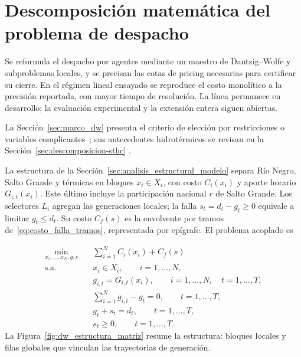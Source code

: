 \section{Descomposición matemática del problema de despacho}
\label{sec:descomposicion_despacho}

Se reformula el despacho por agentes mediante un maestro de Dantzig--Wolfe y subproblemas locales, y se precisan las cotas de pricing necesarias para certificar su cierre. En el régimen lineal ensayado se reproduce el costo monolítico a la precisión reportada, con mayor tiempo de resolución. La línea permanece en desarrollo; la evaluación experimental y la extensión entera siguen abiertas.

La Sección~\ref{sec:marco_dw} presenta el criterio de elección por restricciones o variables complicantes~\cite{ConejoEtAl2006}; sus antecedentes hidrotérmicos se revisan en la Sección~\ref{sec:descomposicion-sthc} \cite{JimenezRedondoConejo1999,BorghettiEtAl2003,SifuentesVargas2007,ScuzziatoEtAl2018,ColonettiEtAl2022,SugishitaGrotheyMcKinnon2024}.

La estructura de la Sección~\ref{sec:analisis_estructural_modelo} separa Río Negro, Salto Grande y térmicas en bloques $x_i\in X_i$, con costo $C_i(x_i)$ y aporte horario $G_{i,t}(x_i)$. Este último incluye la participación nacional $r$ de Salto Grande. Los selectores $L_i$ agregan las generaciones locales; la falla $s_t=d_t-g_t\ge0$ equivale a limitar $g_t\le d_t$. Su costo $C_f(s)$ es la envolvente por tramos de~\eqref{eq:costo_falla_tramos}, representada por epígrafe. El problema acoplado es

\begin{align}
    \min_{x_1,\ldots,x_N,g,s}
    \quad
    &
    \sum_{i=1}^{N} C_i(x_i)
    +
    C_f(s)
    \label{eq:despacho_descomp_obj}
    \\
    \text{s.a.}
    \quad
    &
    x_i \in X_i,
    \qquad i=1,\ldots,N,
    \label{eq:despacho_descomp_local}
    \\
    &
    g_{i,t}=G_{i,t}(x_i),
    \qquad i=1,\ldots,N,\quad t=1,\ldots,T,
    \label{eq:despacho_descomp_generacion_local}
    \\
    &
    \sum_{i=1}^{N} g_{i,t} - g_t = 0,
    \qquad t=1,\ldots,T,
    \label{eq:despacho_descomp_acoplamiento}
    \\
    &
    g_t+s_t=d_t,
    \qquad t=1,\ldots,T,
    \label{eq:despacho_descomp_demanda}
    \\
    &
    s_t\geq 0,
    \qquad t=1,\ldots,T.
    \label{eq:despacho_descomp_falla}
\end{align}
La Figura~\ref{fig:dw_estructura_matriz} resume la estructura: bloques locales y filas globales que vinculan las trayectorias de generación.

